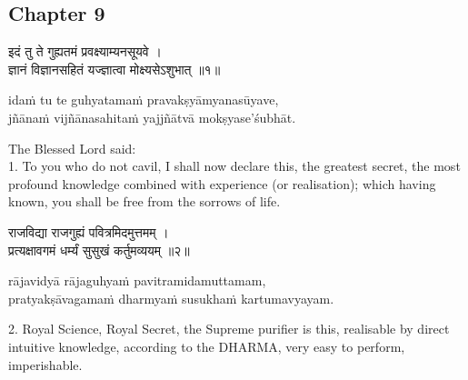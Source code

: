 \chapterdrop

\begin{center}

\headerspace
{}

\section{Chapter 9}

\headerspace
{}

\headerspace
{}

\headerspace
{}

\headerspace
\end{center}

\begin{gitaverse}
इदं तु ते गुह्यतमं प्रवक्ष्याम्यनसूयवे । \\
ज्ञानं विज्ञानसहितं यज्ज्ञात्वा मोक्ष्यसेऽशुभात् ॥१॥
\end{gitaverse}

\begin{transliteration}
idaṁ tu te guhyatamaṁ pravakṣyāmyanasūyave, \\
jñānaṁ vijñānasahitaṁ yajjñātvā mokṣyase'śubhāt.
\end{transliteration}

The Blessed Lord said: \\
1. To you who do not cavil, I shall now declare this, the greatest secret, the
most profound knowledge combined with experience (or realisation); which having
known, you shall be free from the sorrows of life.

\begin{gitaverse}
राजविद्या राजगुह्यं पवित्रमिदमुत्तमम् । \\
प्रत्यक्षावगमं धर्म्यं सुसुखं कर्तुमव्ययम् ॥२॥
\end{gitaverse}

\begin{transliteration}
rājavidyā rājaguhyaṁ pavitramidamuttamam, \\
pratyakṣāvagamaṁ dharmyaṁ susukhaṁ kartumavyayam.
\end{transliteration}

2. Royal Science, Royal Secret, the Supreme purifier is this, realisable by
direct intuitive knowledge, according to the DHARMA, very easy to perform,
imperishable.

